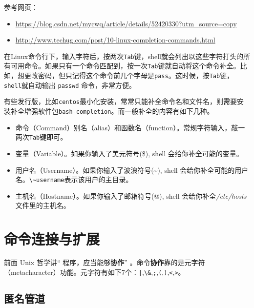 \documentclass[doctor,openright,twoside]{sjtuthesis}
\providecommand{\tightlist}{%
    \setlength{\itemsep}{0pt}\setlength{\parskip}{0pt}}
\newcommand{\passthrough}[1]{#1}
\theoremstyle{plain}
\theoremstyle{definition}
\theoremstyle{remark}
\theoremstyle{ocrenumbox}
\theoremstyle{plain}
\begin{document}
参考网页：

\begin{itemize}
\tightlist
\item
  \url{https://blog.csdn.net/mycwq/article/details/52420330?utm_source=copy}
\item
  \url{http://www.techug.com/post/10-linux-completion-commands.html}
\end{itemize}

在Linux命令行下，输入字符后，按两次\passthrough{\lstinline!Tab!}键，shell就会列出以这些字符打头的所有可用命令。如果只有一个命令匹配到，按一次\passthrough{\lstinline!Tab!}键就自动将这个命令补全。比如，想更改密码，但只记得这个命令前几个字母是\passthrough{\lstinline!pass!}。这时候，按\passthrough{\lstinline!Tab!}键，\passthrough{\lstinline!shell!}就自动输出 \passthrough{\lstinline!passwd!} 命令，非常方便。

有些发行版，比如\passthrough{\lstinline!centos!}最小化安装，常常只能补全命令名和文件名，则需要安装补全增强软件包\passthrough{\lstinline!bash-completion!}。而一般补全的内容有如下几种。

\begin{itemize}
\tightlist
\item
  命令（Command）别名（alias）和函数名（function）。常规字符输入，敲一两次\passthrough{\lstinline!Tab!}键即可。
\item
  变量（Variable）。如果你输入了美元符号(\$), shell 会给你补全可能的变量。
\item
  用户名（Username）。如果你输入了波浪符号(\textasciitilde), shell 会给你补全可能的用户名。\passthrough{\lstinline!\~username!}表示该用户的主目录。
\item
  主机名（Hostname）。如果你输入了邮箱符号(@), shell 会给你补全\emph{/etc/hosts}文件里的主机名。
\end{itemize}

\hypertarget{section-47}{%
\section{命令连接与扩展}\label{section-47}}

前面 Unix 哲学讲`` 程序，应当能够\textbf{协作}'' 。命令\textbf{协作}靠的是元字符（metacharacter）功能。元字符有如下7个：\passthrough{\lstinline!|!},\passthrough{\lstinline!\&!},\passthrough{\lstinline!;!},\passthrough{\lstinline!(!},\passthrough{\lstinline!)!},\passthrough{\lstinline!<!},\passthrough{\lstinline!>!}。

\hypertarget{section-48}{%
\subsection{匿名管道}\label{section-48}}
\end{document}
